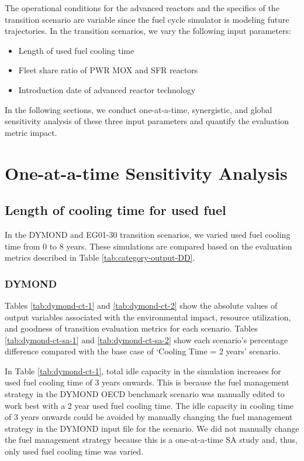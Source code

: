 The operational conditions for the advanced reactors and
the specifics of the transition scenario are variable
since the fuel cycle simulator is modeling future 
trajectories. 
In the transition scenarios, we vary the following 
input parameters: 
\begin{itemize}
    \item Length of used fuel cooling time 
    \item Fleet share ratio of PWR MOX and SFR reactors 
	\item Introduction date of advanced reactor technology
\end{itemize}

In the following sections, 
we conduct one-at-a-time, synergistic, and global
sensitivity analysis of these three input parameters and 
quantify the evaluation metric impact.  

\section{One-at-a-time Sensitivity Analysis}
\label{sec:oat}

\subsection{Length of cooling time for used fuel}
In the DYMOND and \Cyclus EG01-30 transition scenarios, 
we varied used fuel cooling time from 0 to 8 years. 
These simulations are compared based on the evaluation 
metrics described in Table \ref{tab:category-output-DD}.

\subsubsection{\textbf{DYMOND}}
Tables \ref{tab:dymond-ct-1} and \ref{tab:dymond-ct-2} show 
the absolute values of 
output variables associated with the environmental impact, 
resource utilization, and goodness of transition evaluation 
metrics for each scenario. 
Tables \ref{tab:dymond-ct-sa-1} and \ref{tab:dymond-ct-sa-2} 
show each scenario's percentage 
difference compared with the base case of `Cooling Time = 2 years'
scenario.

In Table \ref{tab:dymond-ct-1}, total idle capacity 
in the simulation increases for used fuel cooling time of 3 years 
onwards. 
This is because the fuel management strategy in the 
DYMOND OECD benchmark scenario was 
manually edited to work best with a 2 year used fuel cooling time.
The idle capacity in cooling time of 3 years onwards could be 
avoided by manually changing the fuel management strategy
in the DYMOND input file for the scenario. 
We did not manually change the fuel management strategy
because this is a one-at-a-time \gls{SA} study 
and, thus, only used fuel cooling time was varied. 

